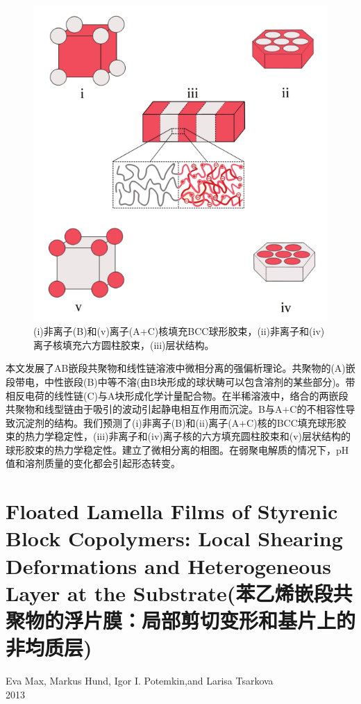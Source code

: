 \documentclass[12pt,a4paper]{article}
\numberwithin{equation}{section}
\begin{document}
\begin{figure}[H]
\centering
\includegraphics[scale=0.4]{./figures/10.png}
\caption{(i)非离子(B)和(v)离子(A+C)核填充BCC球形胶束，(ii)非离子和(iv)离子核填充六方圆柱胶束，(iii)层状结构。}
\end{figure}
本文发展了AB嵌段共聚物和线性链溶液中微相分离的强偏析理论。共聚物的(A)嵌段带电，中性嵌段(B)中等不溶(由B块形成的球状畴可以包含溶剂的某些部分)。带相反电荷的线性链(C)与A块形成化学计量配合物。在半稀溶液中，络合的两嵌段共聚物和线型链由于吸引的波动引起静电相互作用而沉淀。B与A+C的不相容性导致沉淀剂的结构。我们预测了(i)非离子(B)和(ii)离子(A+C)核的BCC填充球形胶束的热力学稳定性，(iii)非离子和(iv)离子核的六方填充圆柱胶束和(v)层状结构的球形胶束的热力学稳定性。建立了微相分离的相图。在弱聚电解质的情况下，pH值和溶剂质量的变化都会引起形态转变。


\section{Floated Lamella Films of Styrenic Block Copolymers: Local Shearing Deformations and Heterogeneous Layer at the Substrate(苯乙烯嵌段共聚物的浮片膜：局部剪切变形和基片上的非均质层)}
\begin{center}
Eva Max,  Markus Hund, Igor I. Potemkin,and Larisa Tsarkova\\
2013
\end{center}
\end{document}
